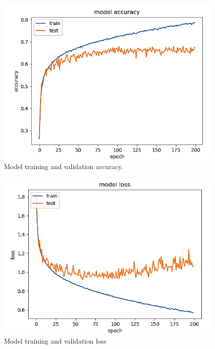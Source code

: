 \documentclass[master]{thesis-uestc}
\begin{document}
\begin{figure}[ht]
\includegraphics[width=5in]{pic/model_accuracy_fer.png}
\caption{Model training and validation accuracy.}
\label{fer_accuracy}
\end{figure}

\begin{figure}[ht]
\includegraphics[width=5in]{pic/model_loss_fer.png}
\caption{Model training and validation loss}
\label{fer_loss}
\end{figure}
\end{document}
